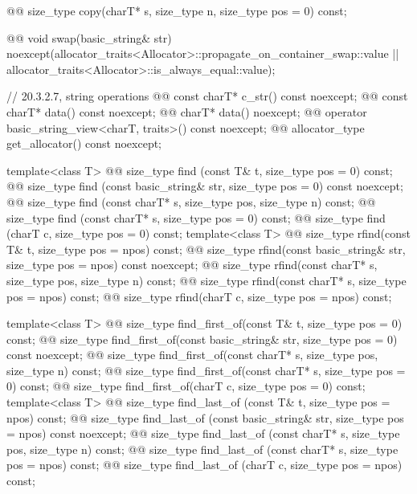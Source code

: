 \documentclass{wg21}
\begin{document}
\begin{codeblock}
{{    @@ size_type copy(charT* s, size_type n, size_type pos = 0) const;

    @@ void swap(basic_string& str)
      noexcept(allocator_traits<Allocator>::propagate_on_container_swap::value ||
               allocator_traits<Allocator>::is_always_equal::value);

    // 20.3.2.7, string operations
    @@ const charT* c_str() const noexcept;
    @@ const charT* data() const noexcept;
    @@ charT* data() noexcept;
    @@ operator basic_string_view<charT, traits>() const noexcept;
    @@ allocator_type get_allocator() const noexcept;

    template<class T>
      @@ size_type find (const T& t, size_type pos = 0) const;
    @@ size_type find (const basic_string& str, size_type pos = 0) const noexcept;
    @@ size_type find (const charT* s, size_type pos, size_type n) const;
    @@ size_type find (const charT* s, size_type pos = 0) const;
    @@ size_type find (charT c, size_type pos = 0) const;
    template<class T>
      @@ size_type rfind(const T& t, size_type pos = npos) const;
    @@ size_type rfind(const basic_string& str, size_type pos = npos) const noexcept;
    @@ size_type rfind(const charT* s, size_type pos, size_type n) const;
    @@ size_type rfind(const charT* s, size_type pos = npos) const;
    @@ size_type rfind(charT c, size_type pos = npos) const;

    template<class T>
      @@ size_type find_first_of(const T& t, size_type pos = 0) const;
    @@ size_type find_first_of(const basic_string& str, size_type pos = 0) const noexcept;
    @@ size_type find_first_of(const charT* s, size_type pos, size_type n) const;
    @@ size_type find_first_of(const charT* s, size_type pos = 0) const;
    @@ size_type find_first_of(charT c, size_type pos = 0) const;
    template<class T>
      @@ size_type find_last_of (const T& t, size_type pos = npos) const;
    @@ size_type find_last_of (const basic_string& str, size_type pos = npos) const noexcept;
    @@ size_type find_last_of (const charT* s, size_type pos, size_type n) const;
    @@ size_type find_last_of (const charT* s, size_type pos = npos) const;
    @@ size_type find_last_of (charT c, size_type pos = npos) const;

}}
\end{codeblock}
\end{document}
